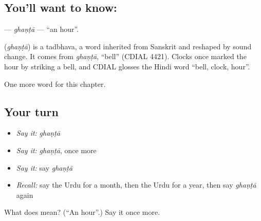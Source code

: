 \subsection*{You'll want to know: }
\textbf{} — \emph{ghaṇṭā} — \textquotedblleft{}an hour\textquotedblright{}.

\begin{cousinweb}
\textbf{} (\emph{ghaṇṭā}) is a tadbhava, a word inherited from Sanskrit and reshaped by sound change. It comes from \emph{ghaṇṭā}, \textquotedblleft{}bell\textquotedblright{} (CDIAL 4421). Clocks once marked the hour by striking a bell, and CDIAL glosses the Hindi word \textquotedblleft{}bell, clock, hour\textquotedblright{}.
\end{cousinweb}

\begin{grammarlens}[title={What you've built}]
One more word for this chapter.
\end{grammarlens}

\subsection*{Your turn}
\begin{itemize}
\raggedright
  \item \emph{Say it:} \emph{ghaṇṭā}
  \item \emph{Say it:} \emph{ghaṇṭā}, once more
  \item \emph{Say it:} say \emph{ghaṇṭā}
  \item \emph{Recall:} say the Urdu for a month, then the Urdu for a year, then say \emph{ghaṇṭā} again
\end{itemize}

\begin{tcolorbox}[breakable,colback=teal!4,colframe=teal!35!black,title={Before you move on}]
What does  mean? (\textquotedblleft{}An hour\textquotedblright{}.) Say it once more.
\end{tcolorbox}
